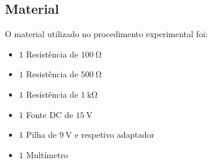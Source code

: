 \subsection{Material}
O material utilizado no procedimento experimental foi: 

\begin{itemize}
	\item $1$ Resistência de $\qty{100}{\ohm}$
	\item $1$ Resistência de $\qty{500}{\ohm}$
	\item $1$ Resistência de $\qty{1}{\kilo\ohm}$
	\item $1$ Fonte DC de $\qty{15}{\volt}$
	\item $1$ Pilha de $\qty{9}{\volt}$ e respetivo adaptador
	\item $1$ Multímetro
\end{itemize}
